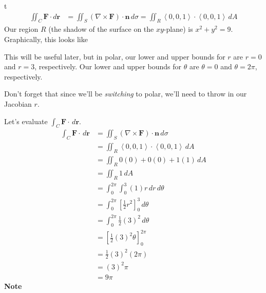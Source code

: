 \documentclass{article}
\newcommand{\lrp}[1]{\left( #1 \right)}
\newcommand{\lra}[1]{\left\langle #1 \right\rangle}
\newcommand{\lrb}[1]{\left[ #1 \right]}
\renewcommand{\r}[0]{\mathbf{r}}
\newcommand{\F}[0]{\mathbf{F}}
\newcommand{\n}[0]{\mathbf{n}}
\begin{document}
t
\begin{align*}
    \iint_C \F\cdot d\r&=\iint_S\lrp{\nabla \times \F}\cdot \n \,d\sigma = \iint_R \lra{0,0,1}\cdot \lra{0,0,1}\,dA
\end{align*}
Our region $R$ (the shadow of the surface on the $xy$-plane) is $x^2+y^2=9$. Graphically, this looks like
\begin{center}
\end{center}
This will be useful later, but in polar, our lower and upper bounds for $r$ are $r=0$ and $r=3$, respectively.
Our lower and upper bounds for $\theta$ are $\theta=0$ and $\theta=2\pi $, respectively.

Don't forget that since we'll be \textit{switching} to polar, we'll need to throw in our Jacobian $r$.

Let's evaluate $\displaystyle\int_C\F\cdot\,d\r$.
\begin{align*}
    \int_C \F\cdot \,d\r&=\iint_S \lrp{\nabla \times \F}\cdot \n \,d\sigma\\
    &=\iint_R \lra{0,0,1}\cdot \lra{0,0,1}\,dA\\
    &=\iint_R 0(0)+0(0)+1(1)\,dA\\
    &=\iint_R 1\,dA\tag{see note}\\
    &=\int_0^{2\pi}\int_0^3 (1)r\,dr\,d\theta\tag{let's switch to polar}\\
    &=\int_0^{2\pi}\lrb{\frac{1}{2}r^2}_0^3\,d\theta\\
    &=\int_0^{2\pi} \frac{1}{2}(3)^2\,d\theta\\
    &=\lrb{\frac{1}{2}(3)^2\theta}_0^{2\pi}\\
    &=\frac{1}{2}(3)^2(2\pi)\\
    &=(3)^2\pi\\
    &=\boxed{9\pi}
\end{align*}
\textbf{Note}
\end{document}
